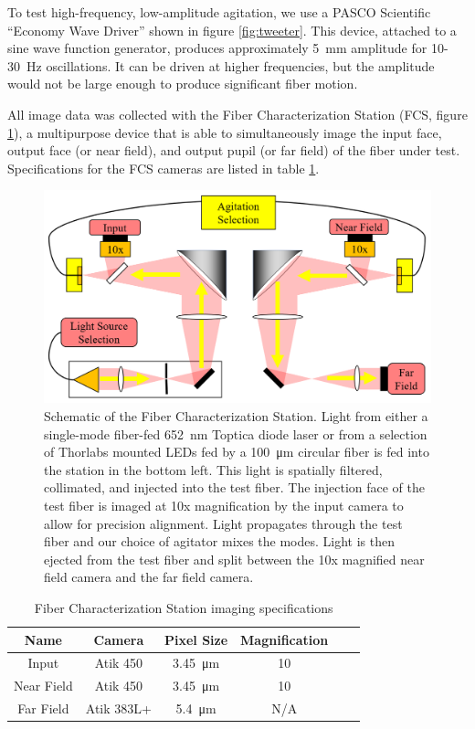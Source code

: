 \documentclass[twocolumn]{emulateapj}
\begin{document}
To test high-frequency, low-amplitude agitation, we use a PASCO Scientific ``Economy Wave Driver'' shown in figure \ref{fig:tweeter}. This device, attached to a sine wave function generator, produces approximately \SI{5}{\milli\meter} amplitude for 10-\SI{30}{\hertz} oscillations. It can be driven at higher frequencies, but the amplitude would not be large enough to produce significant fiber motion.

All image data was collected with the Fiber Characterization Station (FCS, figure \ref{fig:fcs}), a multipurpose device that is able to simultaneously image the input face, output face (or near field), and output pupil (or far field) of the fiber under test. Specifications for the FCS cameras are listed in table \ref{table:cameras}.

\begin{figure}
\centering
	\includegraphics[width=\columnwidth]{images/fcs_schematic.png}
	\caption{Schematic of the Fiber Characterization Station. Light from either a single-mode fiber-fed \SI{652}{\nano\meter} Toptica diode laser or from a selection of Thorlabs mounted LEDs fed by a \SI{100}{\micro\meter} circular fiber is fed into the station in the bottom left. This light is spatially filtered, collimated, and injected into the test fiber. The injection face of the test fiber is imaged at 10x magnification by the input camera to allow for precision alignment. Light propagates through the test fiber and our choice of agitator mixes the modes. Light is then ejected from the test fiber and split between the 10x magnified near field camera and the far field camera.}
\label{fig:fcs}
\end{figure}

\begin{table}
\centering
\caption{Fiber Characterization Station imaging specifications}
	\begin{tabular}{cccccc}
	\hline
	Name & Camera & Pixel Size & Magnification \\
	\hline \hline
	Input & Atik 450 & \SI{3.45}{\micro\meter} & 10 \\
	\hline
	Near Field & Atik 450 & \SI{3.45}{\micro\meter} & 10 \\
	\hline
	Far Field & Atik 383L+ & \SI{5.4}{\micro\meter} & N/A \\
	\hline	
	\end{tabular}
\label{table:cameras}
\end{table}
\end{document}
